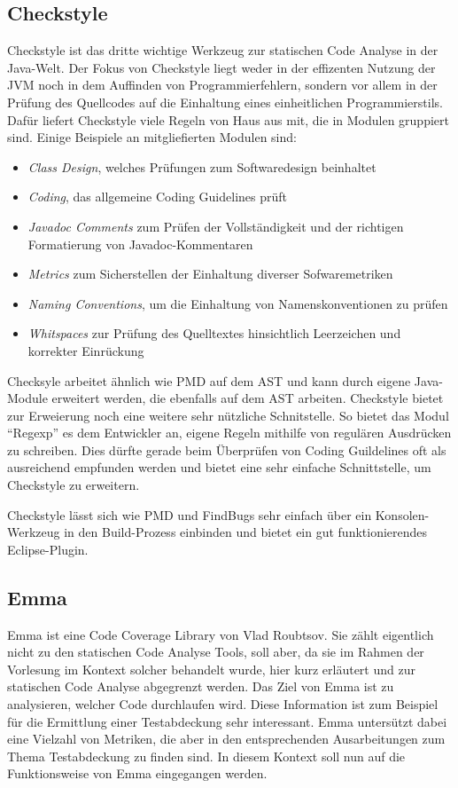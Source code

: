 \subsection{Checkstyle}

Checkstyle ist das dritte wichtige Werkzeug zur statischen Code Analyse in der Java-Welt. Der Fokus von Checkstyle liegt weder in der effizenten Nutzung der JVM noch in dem Auffinden von Programmierfehlern, sondern vor allem in der Prüfung des Quellcodes auf die Einhaltung eines einheitlichen Programmierstils. 
Dafür liefert Checkstyle viele Regeln von Haus aus mit, die in Modulen gruppiert sind. Einige Beispiele an mitgliefierten Modulen sind:
\begin{itemize}
\item \textit{Class Design}, welches Prüfungen zum Softwaredesign beinhaltet
\item \textit{Coding}, das allgemeine Coding Guidelines prüft
\item \textit{Javadoc Comments} zum Prüfen der Vollständigkeit und der richtigen Formatierung von Javadoc-Kommentaren
\item \textit{Metrics} zum Sicherstellen der  Einhaltung diverser Sofwaremetriken
\item \textit{Naming Conventions}, um die Einhaltung von Namenskonventionen zu prüfen
\item \textit{Whitspaces} zur Prüfung des Quelltextes hinsichtlich Leerzeichen und korrekter Einrückung
\end{itemize}
Checksyle arbeitet ähnlich wie PMD auf dem AST und kann durch eigene Java-Module erweitert werden, die ebenfalls auf dem AST arbeiten. Checkstyle bietet zur Erweierung noch eine weitere sehr nützliche Schnitstelle. So bietet das Modul ``Regexp'' es dem Entwickler an, eigene Regeln mithilfe von regulären Ausdrücken zu schreiben. Dies dürfte gerade beim Überprüfen von Coding Guildelines oft als ausreichend empfunden werden und bietet eine sehr einfache Schnittstelle, um Checkstyle zu erweitern.

Checkstyle lässt sich wie PMD und FindBugs sehr einfach über ein Konsolen-Werkzeug in den Build-Prozess einbinden und bietet ein gut funktionierendes Eclipse-Plugin.


\subsection{Emma}

Emma ist eine Code Coverage Library von Vlad Roubtsov. Sie zählt eigentlich nicht zu den statischen Code Analyse Tools, soll aber, da sie im Rahmen der Vorlesung im Kontext solcher behandelt wurde, hier kurz erläutert und zur statischen Code Analyse abgegrenzt werden. 
Das Ziel von Emma ist zu analysieren, welcher Code durchlaufen wird. Diese Information ist zum Beispiel für die Ermittlung einer Testabdeckung sehr interessant. Emma untersützt dabei eine Vielzahl von Metriken, die aber in den entsprechenden Ausarbeitungen zum Thema Testabdeckung zu finden sind. In diesem Kontext soll nun auf die Funktionsweise von Emma eingegangen werden.


